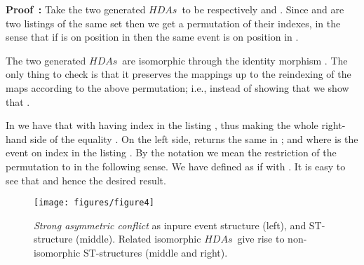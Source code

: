 \documentclass[submission,copyright,creativecommons]{eptcs}
\newenvironment{proof}[1][\!\!\,]{\vspace{1ex}\noindent\textbf{Proof #1: }}{\hfill\vspace{2ex}}
\newcommand\HDAs{\ensuremath{\mathit{HDAs}}}
\begin{document}
\begin{proof}
Take the two generated \HDAs\ to be respectively   and . Since  and  are two listings of the same set then we get a permutation  of their indexes, in the sense that if  is on position  in  then the same event is on position  in .

The two generated \HDAs\ are isomorphic through the identity morphism . The only thing to check is that it preserves the mappings up to the reindexing of the maps according to the above permutation; i.e., instead of showing that  we show that .

In  we have that  with  having index  in the listing , thus making the whole right-hand side of the equality . On the left side,  returns the same  in ; and  where  is the event on index  in the listing . By the notation  we mean the restriction of the permutation  to  in the following sense. We have  defined as  if  with .
It is easy to see that  and hence the desired result.
\end{proof}


\begin{figure}[tp]
\psfrag{HDA}{{\scriptsize on \HDAs}}
  \begin{center}
    \texttt{[image: figures/figure4]}
  \end{center}
\caption{\textit{Strong asymmetric conflict}  as inpure event structure (left), and ST-structure (middle). Related isomorphic \HDAs\ give rise to non-isomorphic ST-structures (middle and right).}
\label{fig_ex_asymconflict1}
\end{figure}
\end{document}
